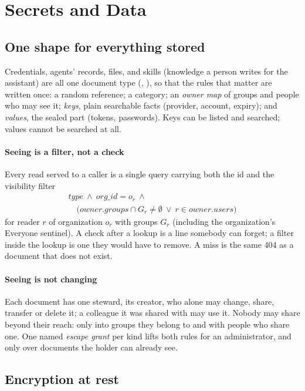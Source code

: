 \section{Secrets and Data}
\label{sec:secrets}

\subsection{One shape for everything stored}

Credentials, agents' records, files, and skills (knowledge a person
writes for the assistant) are all one document type
(, ),
so that the rules that matter are written once: a random reference; a
category; an \emph{owner map} of groups and people who may see it;
\emph{keys}, plain searchable facts (provider, account, expiry); and
\emph{values}, the sealed part (tokens, passwords). Keys can be listed
and searched; values cannot be searched at all.

\paragraph{Seeing is a filter, not a check}
Every read served to a caller is a single query carrying both the id
and the visibility filter
\[
\begin{array}{l}
\mathit{type}\ \land\ \mathit{org\_id} = o_r\ \land\\
\quad\bigl(\mathit{owner.groups} \cap G_r \neq \emptyset\ \lor\ r \in \mathit{owner.users}\bigr)
\end{array}
\]
for reader $r$ of organization $o_r$ with groups $G_r$ (including the
organization's Everyone sentinel). A check after a lookup is a line
somebody can forget; a filter inside the lookup is one they would have
to remove. A miss is the same 404 as a document that does not exist.

\paragraph{Seeing is not changing}
Each document has one steward, its creator, who alone may change,
share, transfer or delete it; a colleague it was shared with may use
it. Nobody may share beyond their reach: only into groups they belong
to and with people who share one. One named \emph{escape grant} per
kind lifts both rules for an administrator, and only over documents
the holder can already see.

\subsection{Encryption at rest}

